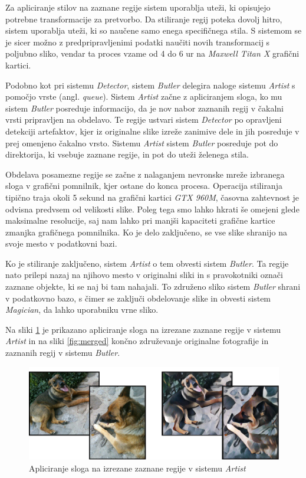 \documentclass[runningheads,a4paper]{llncs}
\begin{document}
Za apliciranje stilov na zaznane regije sistem uporablja uteži, ki opisujejo potrebne transformacije za pretvorbo. Da stiliranje regij poteka dovolj hitro, sistem uporablja uteži, ki so naučene samo enega specifičnega stila. S sistemom se je sicer možno z predpripravljenimi podatki \cite{vgg-19} naučiti novih transformacij s poljubno sliko, vendar ta proces vzame od 4 do 6 ur na \textit{ Maxwell Titan X} grafični kartici.

Podobno kot pri sistemu \textit{Detector}, sistem \textit{Butler} delegira naloge sistemu \textit{Artist} s pomočjo vrste (angl. \textit{queue}). Sistem \textit{Artist} začne z apliciranjem sloga, ko mu sistem \textit{Butler} posreduje informacijo, da je nov nabor zaznanih regij v čakalni vrsti pripravljen na obdelavo. Te regije ustvari sistem \textit{Detector} po opravljeni detekciji artefaktov, kjer iz originalne slike izreže zanimive dele in jih posreduje v prej omenjeno čakalno vrsto. Sistemu \textit{Artist} sistem \textit{Butler} posreduje pot do direktorija, ki vsebuje zaznane regije, in pot do uteži želenega stila.

Obdelava posamezne regije se začne z nalaganjem nevronske mreže izbranega sloga v grafični pomnilnik, kjer ostane do konca procesa. Operacija stiliranja tipično traja okoli 5 sekund na grafični kartici \textit{GTX 960M}, časovna zahtevnost je odvisna predvsem od velikosti slike. Poleg tega smo lahko hkrati še omejeni glede maksimalne resolucije, saj nam lahko pri manjši kapaciteti grafične kartice zmanjka grafičnega pomnilnika. Ko je delo zaključeno, se vse slike shranijo na svoje mesto v podatkovni bazi.

Ko je stiliranje zaključeno, sistem \textit{Artist} o tem obvesti sistem \textit{Butler}. Ta regije nato prilepi nazaj na njihovo mesto v originalni sliki in s pravokotniki označi zaznane objekte, ki se naj bi tam nahajali. To združeno sliko sistem \textit{Butler} shrani v podatkovno bazo, s čimer se zaključi obdelovanje slike in obvesti sistem \textit{Magician}, da lahko uporabniku vrne sliko.

Na sliki \ref{fig:detector_artist} je prikazano apliciranje sloga na izrezane zaznane regije v sistemu \textit{Artist} in na sliki \ref{fig:merged} končno združevanje originalne fotografije in zaznanih regij v sistemu \textit{Butler}.

\begin{figure}[H]
\centering
\includegraphics[width=\textwidth, center]{figures/neural_example/detector_artist.png}
\caption{Apliciranje sloga na izrezane zaznane regije v sistemu \textit{Artist}}
\label{fig:detector_artist}
\end{figure}
\end{document}
